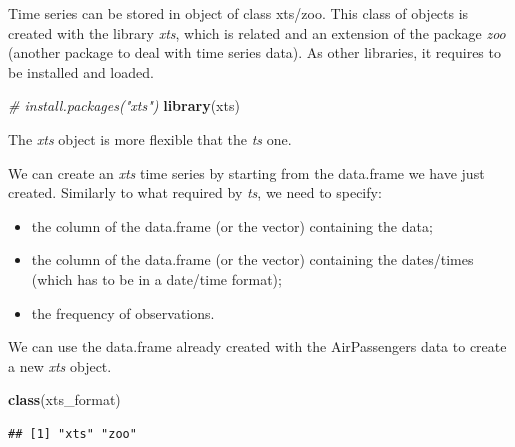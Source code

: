 \documentclass[
]{article}
\newenvironment{Shaded}{\begin{snugshade}}{\end{snugshade}}
\newcommand{\CommentTok}[1]{\textcolor[rgb]{0.56,0.35,0.01}{\textit{#1}}}
\newcommand{\DataTypeTok}[1]{\textcolor[rgb]{0.13,0.29,0.53}{#1}}
\newcommand{\DecValTok}[1]{\textcolor[rgb]{0.00,0.00,0.81}{#1}}
\newcommand{\KeywordTok}[1]{\textcolor[rgb]{0.13,0.29,0.53}{\textbf{#1}}}
\newcommand{\NormalTok}[1]{#1}
\newcommand{\OperatorTok}[1]{\textcolor[rgb]{0.81,0.36,0.00}{\textbf{#1}}}
\newcommand{\StringTok}[1]{\textcolor[rgb]{0.31,0.60,0.02}{#1}}
\providecommand{\tightlist}{%
  \setlength{\itemsep}{0pt}\setlength{\parskip}{0pt}}
\begin{document}
Time series can be stored in object of class xts/zoo. This class of objects is created with the library \emph{xts}, which is related and an extension of the package \emph{zoo} (another package to deal with time series data). As other libraries, it requires to be installed and loaded.

\begin{Shaded}
\begin{Highlighting}[]
\CommentTok{# install.packages("xts")}
\KeywordTok{library}\NormalTok{(xts)}
\end{Highlighting}
\end{Shaded}

The \emph{xts} object is more flexible that the \emph{ts} one.

We can create an \emph{xts} time series by starting from the data.frame we have just created. Similarly to what required by \emph{ts}, we need to specify:

\begin{itemize}
\tightlist
\item
  the column of the data.frame (or the vector) containing the data;
\item
  the column of the data.frame (or the vector) containing the dates/times (which has to be in a date/time format);
\item
  the frequency of observations.
\end{itemize}

We can use the data.frame already created with the AirPassengers data to create a new \emph{xts} object.

\begin{Shaded}
\end{Shaded}

\begin{Shaded}
\begin{Highlighting}[]
\KeywordTok{class}\NormalTok{(xts_format)}
\end{Highlighting}
\end{Shaded}

\begin{verbatim}
## [1] "xts" "zoo"
\end{verbatim}
\end{document}
